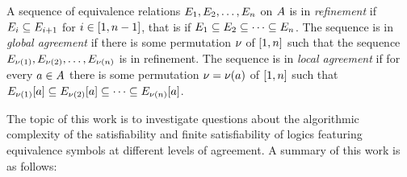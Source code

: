 
A sequence of equivalence relations $E_{1},E_{2},\dots,E_{n}$ on $A$
is in \emph{refinement} if $E_{i}\subseteq E_{i+1}$ for
$i\in[1,n-1]$, that is if
$E_{1}\subseteq E_{2}\subseteq\dots\subseteq E_{n}$.
The sequence is in \emph{global agreement} if there is some permutation
$\nu$ of $[1,n]$ such that the sequence
$E_{\nu(1)}, E_{\nu(2)}, \dots, E_{\nu(n)}$ is in
refinement.
The sequence is in \emph{local agreement} if for every $a\in A$ there is
some permutation $\nu = \nu(a)$ of $[1,n]$ such that
$E_{\nu(1)}[a] \subseteq E_{\nu(2)}[a] \subseteq \dots
\subseteq E_{\nu(n)}[a]$.

The topic of this work is to investigate questions about the algorithmic
complexity of the satisfiability and finite satisfiability of logics featuring
equivalence symbols at different levels of agreement.
A summary of this work is as follows:
